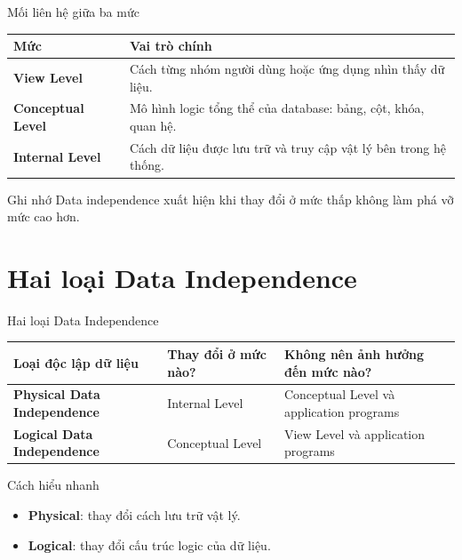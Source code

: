 \documentclass[aspectratio=169,11pt]{beamer}
\begin{document}
\begin{frame}{Mối liên hệ giữa ba mức}
\begin{tabularx}{\textwidth}{>{\bfseries}p{}X}
\toprule
Mức & Vai trò chính \\
\midrule
View Level & Cách từng nhóm người dùng hoặc ứng dụng nhìn thấy dữ liệu. \\
Conceptual Level & Mô hình logic tổng thể của database: bảng, cột, khóa, quan hệ. \\
Internal Level & Cách dữ liệu được lưu trữ và truy cập vật lý bên trong hệ thống. \\
\bottomrule
\end{tabularx}

\vspace{0.3cm}
\begin{alertblock}{Ghi nhớ}
Data independence xuất hiện khi thay đổi ở mức thấp không làm phá vỡ mức cao hơn.
\end{alertblock}
\end{frame}

\section{Hai loại Data Independence}

\begin{frame}{Hai loại Data Independence}
\begin{tabularx}{\textwidth}{>{\bfseries}p{}p{}X}
\toprule
Loại độc lập dữ liệu & Thay đổi ở mức nào? & Không nên ảnh hưởng đến mức nào? \\
\midrule
Physical Data Independence & Internal Level & Conceptual Level và application programs \\
Logical Data Independence & Conceptual Level & View Level và application programs \\
\bottomrule
\end{tabularx}

\vspace{0.4cm}
\begin{block}{Cách hiểu nhanh}
\begin{itemize}
  \item \textbf{Physical}: thay đổi cách lưu trữ vật lý.
  \item \textbf{Logical}: thay đổi cấu trúc logic của dữ liệu.
\end{itemize}
\end{block}
\end{frame}
\end{document}
